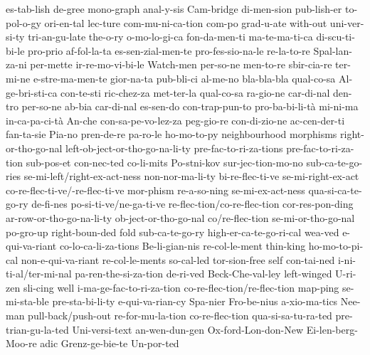 {es-tab-lish
de-gree
mono-graph
anal-y-sis
Cam-bridge
di-men-sion
pub-lish-er
to-pol-o-gy
ori-en-tal
lec-ture
com-mu-ni-ca-tion
com-po
grad-u-ate
with-out
uni-ver-si-ty
tri-an-gu-late
the-o-ry
%
%
o-mo-lo-gi-ca
fon-da-men-ti
ma-te-ma-ti-ca
di-scu-ti-bi-le
pro-prio
af-fol-la-ta
es-sen-zial-men-te
pro-fes-sio-na-le
re-la-to-re
Spal-lan-za-ni
per-mette
ir-re-mo-vi-bi-le
Watch-men
per-so-ne
men-to-re
sbir-cia-re
ter-mi-ne
e-stre-ma-men-te
gior-na-ta
pub-bli-ci
al-me-no
bla-bla-bla
qual-co-sa
Al-ge-bri-sti-ca
con-te-sti
ric-chez-za
met-ter-la
qual-co-sa
ra-gio-ne
car-di-nal
den-tro
per-so-ne
ab-bia
car-di-nal
es-sen-do
con-trap-pun-to
pro-ba-bi-li-tà
mi-ni-ma
in-ca-pa-ci-tà
An-che
con-sa-pe-vo-lez-za
peg-gio-re
con-di-zio-ne
ac-cen-der-ti
fan-ta-sie
Pia-no
pren-de-re
pa-ro-le
%
%
ho-mo-to-py
neighbourhood
morphisms
right-or-tho-go-nal
left-ob-ject-or-tho-go-na-li-ty
pre-fac-to-ri-za-tions
pre-fac-to-ri-za-tion
sub-pos-et
con-nec-ted
co-li-mits
Po-stni-kov
sur-jec-tion-mo-no
sub-ca-te-go-ries
se-mi-left/right-ex-act-ness
non-nor-ma-li-ty
bi-re-flec-ti-ve
se-mi-right-ex-act
co-re-flec-ti-ve/-re-flec-ti-ve
mor-phism
re-a-so-ning
se-mi-ex-act-ness
qua-si-ca-te-go-ry
de-fi-nes
po-si-ti-ve/ne-ga-ti-ve
re-flec-tion/co-re-flec-tion
cor-res-pon-ding
ar-row-or-tho-go-na-li-ty
ob-ject-or-tho-go-nal
co/re-flec-tion
se-mi-or-tho-go-nal
po-gro-up
right-boun-ded
fold
sub-ca-te-go-ry
high-er-ca-te-go-ri-cal
wea-ved
e-qui-va-riant
co-lo-ca-li-za-tions
Be-li-gian-nis
re-col-le-ment
thin-king
ho-mo-to-pi-cal
non-e-qui-va-riant
re-col-le-ments
so-cal-led
tor-sion-free
self
con-tai-ned
i-ni-ti-al/ter-mi-nal
pa-ren-the-si-za-tion
de-ri-ved
Beck-Che-val-ley
left-winged
U-ri-zen
sli-cing
well
i-ma-ge-fac-to-ri-za-tion
co-re-flec-tion/re-flec-tion
map-ping
se-mi-sta-ble
pre-sta-bi-li-ty
e-qui-va-rian-cy
Spa-nier
Fro-be-nius
a-xio-ma-tics
Nee-man
pull-back/push-out
re-for-mu-la-tion
co-re-flec-tion
qua-si-sa-tu-ra-ted
pre-trian-gu-la-ted
Uni-versi-text
an-wen-dun-gen
Ox-ford-Lon-don-New
Ei-len-berg-Moo-re
adic
Grenz-ge-bie-te
Un-por-ted
}

